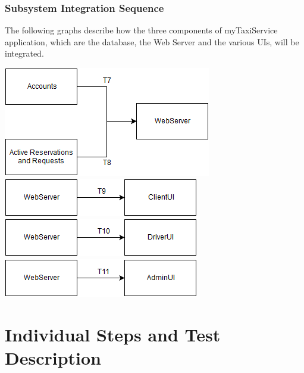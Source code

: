 \documentclass{article}
\begin{document}
\subsubsection{Subsystem Integration Sequence}
The following graphs describe how the three 
components of myTaxiService application, 
which are the database, the Web Server and 
the various UIs, will be integrated.
\begin{center}
	\includegraphics{DBWS}
	\includegraphics{WSUI1}
	\includegraphics{WSUI2}
	\includegraphics{WSUI3}
\end{center}
\section{Individual Steps and Test Description}
\end{document}
